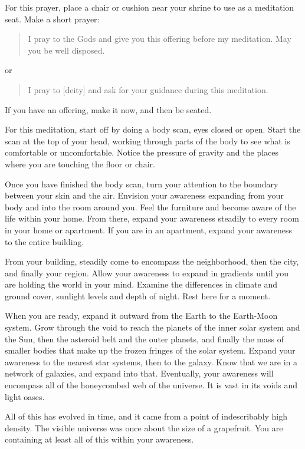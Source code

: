 \documentclass[
]{book}
\begin{document}
For this prayer, place a chair or cushion near your shrine to use as a meditation seat. Make a short prayer:

\begin{quote}
I pray to the Gods and give you this offering before my meditation. May you be well disposed.
\end{quote}

or

\begin{quote}
I pray to {[}deity{]} and ask for your guidance during this meditation.
\end{quote}

If you have an offering, make it now, and then be seated.

For this meditation, start off by doing a body scan, eyes closed or open. Start the scan at the top of your head, working through parts of the body to see what is comfortable or uncomfortable. Notice the pressure of gravity and the places where you are touching the floor or chair.

Once you have finished the body scan, turn your attention to the boundary between your skin and the air. Envision your awareness expanding from your body and into the room around you. Feel the furniture and become aware of the life within your home. From there, expand your awareness steadily to every room in your home or apartment. If you are in an apartment, expand your awareness to the entire building.

From your building, steadily come to encompass the neighborhood, then the city, and finally your region. Allow your awareness to expand in gradients until you are holding the world in your mind. Examine the differences in climate and ground cover, sunlight levels and depth of night. Rest here for a moment.

When you are ready, expand it outward from the Earth to the Earth-Moon system. Grow through the void to reach the planets of the inner solar system and the Sun, then the asteroid belt and the outer planets, and finally the mass of smaller bodies that make up the frozen fringes of the solar system. Expand your awareness to the nearest star systems, then to the galaxy. Know that we are in a network of galaxies, and expand into that. Eventually, your awareness will encompass all of the honeycombed web of the universe. It is vast in its voids and light oases.

All of this has evolved in time, and it came from a point of indescribably high density. The visible universe was once about the size of a grapefruit. You are containing at least all of this within your awareness.
\end{document}
